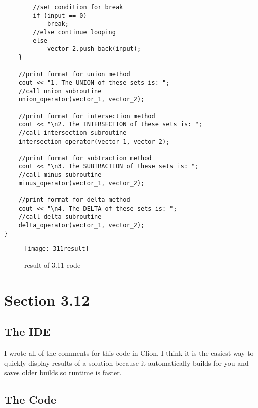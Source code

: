 \documentclass[11pt]{article}
\begin{document}
\begin{lstlisting}
        //set condition for break
        if (input == 0)
            break;
        //else continue looping
        else
            vector_2.push_back(input);
    }

    //print format for union method
    cout << "1. The UNION of these sets is: ";
    //call union subroutine
    union_operator(vector_1, vector_2);

    //print format for intersection method
    cout << "\n2. The INTERSECTION of these sets is: ";
    //call intersection subroutine
    intersection_operator(vector_1, vector_2);

    //print format for subtraction method
    cout << "\n3. The SUBTRACTION of these sets is: ";
    //call minus subroutine
    minus_operator(vector_1, vector_2);

    //print format for delta method
    cout << "\n4. The DELTA of these sets is: ";
    //call delta subroutine
    delta_operator(vector_1, vector_2);
}
\end{lstlisting}

\begin{figure}
    \centering
    \texttt{[image: 311result]}
    \caption{result of 3.11 code}
    \label{fig:my_label}
\end{figure}


\section*{Section 3.12}

\subsection*{The IDE}
I wrote all of the comments for this code in Clion, I think it is the easiest way to quickly display results of a solution because it automatically builds for you and saves older builds so runtime is faster. 

\subsection*{The Code}
\end{document}
